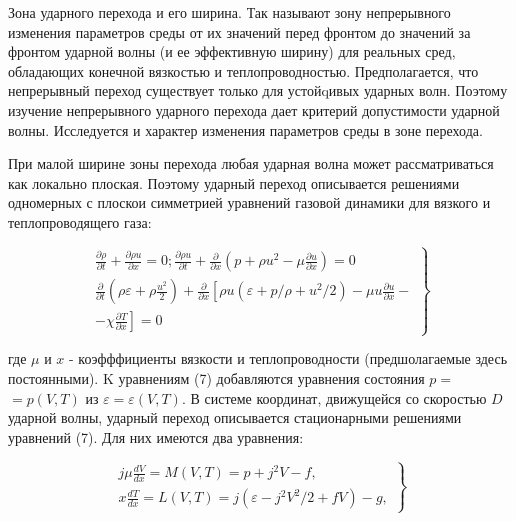 \documentclass[10pt]{article}
\begin{document}
Зона ударного перехода и его ширина. Так называют зону непрерывного изменения параметров среды от их значений перед фронтом до значений за фронтом ударной волны (и ее эффективную ширину) для реальных сред, обладающих конечной вязкостью и теплопроводностью. Предполагается, что непрерывный переход существует только для устойqивых ударных волн. Поэтому изучение непрерывного ударного перехода дает критерий допустимости ударной волны. Исследуется и характер изменения параметров среды в зоне перехода.



При малой ширине зоны перехода любая ударная волна может рассматриваться как локально плоская. Поэтому ударный переход описывается решениями одномерных с плоскои симметрией уравнений газовой динамики для вязкого и теплопроводящего газа:



\[

\left.\begin{array}{r}

\frac{\partial \rho}{\partial t}+\frac{\partial \rho u}{\partial x}=0 ; \frac{\partial \rho u}{\partial t}+\frac{\partial}{\partial x}\left(p+\rho u^{2}-\mu \frac{\partial u}{\partial x}\right)=0 \\

\frac{\partial}{\partial t}\left(\rho \varepsilon+\rho \frac{u^{2}}{2}\right)+\frac{\partial}{\partial x}\left[\rho u\left(\varepsilon+p / \rho+u^{2} / 2\right)-\mu u \frac{\partial u}{\partial x}-\right. \\

\left.-\chi \frac{\partial T}{\partial x}\right]=0

\end{array}\right\}

\]



где $\mu$ и $x$ - коэфффициенты вязкости и теплопроводности (предшолагаемые здесь постоянными). $\mathrm{K}$ уравнениям (7) добавляются уравнения состояния $p=$ $=p(V, T)$ из $\varepsilon=\varepsilon(V, T)$. В системе координат, движущейся со скоростью $D$ ударной волны, ударный переход описывается стационарными решениями уравнений (7). Для них имеются два уравнения:



\[

\left.\begin{array}{l}

j \mu \frac{d V}{d x}=M(V, T)=p+j^{2} V-f, \\

x \frac{d T}{d x}=L(V, T)=j\left(\varepsilon-j^{2} V^{2} / 2+f V\right)-g,

\end{array}\right\}

\]
\end{document}

